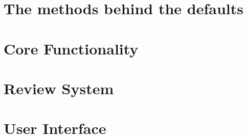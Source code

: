 \documentclass[a4paper,oneside]{memoir}
\begin{document}







\part{The methods behind the defaults}


\part{Core Functionality}















\part{Review System}






\part{User Interface}




\backmatter

\printbibliography[heading=bibintoc]
\end{document}
